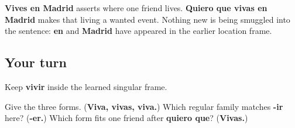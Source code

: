 \begin{grammarlens}[title={Grammar Lens: meaning in a known frame}]
\textbf{Vives en Madrid} asserts where one friend lives. \textbf{Quiero que vivas en Madrid} makes that living a wanted event. Nothing new is being smuggled into the sentence: \textbf{en} and \textbf{Madrid} have appeared in the earlier location frame.
\end{grammarlens}

\subsection*{Your turn}
Keep \textbf{vivir} inside the learned singular frame.

\begin{tcolorbox}[breakable,colback=teal!4,colframe=teal!35!black,title={Before you move on}]
Give the three forms. (\textbf{Viva, vivas, viva.}) Which regular family matches \textbf{-ir} here? (\textbf{-er.}) Which form fits one friend after \textbf{quiero que}? (\textbf{Vivas.})
\end{tcolorbox}
